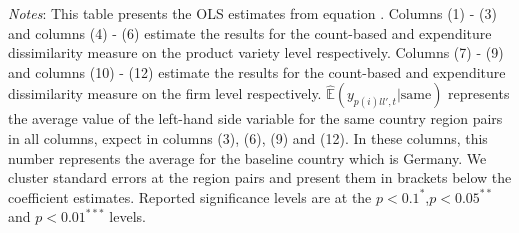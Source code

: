\begin{landscape}
    \begin{table}
        \centering
        \caption{Border effect: Choice set dissimilarity}
        \label{tab: border_effects_choice}
        \begin{spacing}{1.1}
        \end{spacing}
        \parbox{1.2\textwidth}{
        \begin{spacing}{1} 
            {\footnotesize 
            \textit{Notes}: This table presents the OLS estimates from equation \label{eq:border_effect_barcodes}. Columns (1) - (3) and columns (4) - (6) estimate the results for the count-based and expenditure dissimilarity measure on the product variety level respectively. Columns (7) - (9) and columns (10) - (12) estimate the results for the count-based and expenditure dissimilarity measure on the firm level respectively. $\hat{\mathbb{E}}\left(y_{p(i)ll',t}|\text{same}\right)$ represents the average value of the left-hand side variable for the same country region pairs in all columns, expect in columns (3), (6), (9) and (12). In these columns, this number represents the average for the baseline country which is Germany. We cluster standard errors at the region pairs and present them in brackets below the coefficient estimates. Reported significance levels are at the $p<0.1^{*}$,$p<0.05^{**}$ and $p<0.01^{***}$ levels.} 
        \end{spacing}}
     \end{table}
\end{landscape}

